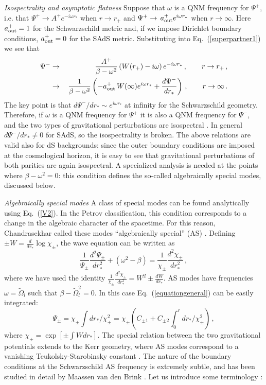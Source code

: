 \documentclass[]{iopart}
\def\be{\begin{equation}}
\def\ee{\end{equation}}
\def\beq{\begin{eqnarray}}
\def\eeq{\end{eqnarray}}
\begin{document}
\noindent
{\it Isospectrality and asymptotic flatness} 
Suppose that $\omega$ is a QNM frequency for $\Psi^+$, i.e. that $\Psi^+
\rightarrow A^{+}e^{-i\omega r_*}$ when $r \rightarrow r_+$ and $\Psi^+
\rightarrow\,a^{+}_{\rm out}e^{i\omega r_*} $ when $r\rightarrow \infty$.
Here $a^{+}_{\rm out}=1$ for the Schwarzschild metric and, if we impose
Dirichlet boundary conditions, $a^{+}_{\rm out}=0$ for the SAdS metric.
Substituting into Eq.~(\ref{superpartner1}) we see that
%
\beq
\Psi^-&\rightarrow& \frac{A^{+}}{\beta-\omega^2}\left (W(r_+)-i\omega \right )e^{-i\omega r_*}\,,\qquad r \rightarrow r_+\,,\\
&\rightarrow & \,\frac{1}{\beta-\omega^2}\left (-a^{+}_{\rm out}\,W(\infty)e^{i\omega r_*}+\frac{d \Psi^{-}}{dr_*}\right ) \,,\qquad r\rightarrow \infty\,.
\eeq
%
The key point is that $d \Psi^{-}/dr_* \sim e^{i\omega r_*} $ at infinity for
the Schwarzschild geometry. Therefore, if $\omega$ is a QNM frequency for
$\Psi^{+}$ it is also a QNM frequency for $\Psi^{-}$, and the two types of
gravitational perturbations are isospectral
\cite{Chandrasekhar:1975qn,chandrarelation}. In general $d\Psi^{-}/dr_* \neq
0$ for SAdS, so the isospectrality is broken.  The above relations are valid
also for dS backgrounds: since the outer boundary conditions are imposed at
the cosmological horizon, it is easy to see that gravitational perturbations
of both parities are again isospectral.  A specialized analysis is needed at
the points where $\beta-\omega^2=0$: this condition defines the so-called
algebraically special modes, discussed below.

\noindent
{\it Algebraically special modes}
A class of special modes can be found analytically using Eq.~(\ref{V2}). In
the Petrov classification, this condition corresponds to a change in the
algebraic character of the spacetime. For this reason, Chandrasekhar called
these modes ``algebraically special'' (AS) \cite{chandraspecial,MTB}.
Defining $\pm W=\frac{d}{dr_*}\log \chi_\pm$, the wave equation can be written
as
%
\begin{equation}
\frac{1}{\Psi_{\pm}}\frac{d^2\Psi_{\pm}}{dr_*^2}+\left
(\omega^2-\beta \right )=
\frac{1}{\chi_\pm}\frac{d^2\chi_\pm}{dr_*^2}\,,
\label{equationgeneral}
\end{equation}
%
where we have used the identity $
\frac{1}{\chi_\pm}\frac{d^2\chi_\pm}{dr_*^2}=W^2\pm\frac{dW}{dr_*}$. AS modes
have frequencies $\omega=\tilde \Omega_l$ such that $\beta-\tilde \Omega_l^2=
0$. In this case Eq.~(\ref{equationgeneral}) can be easily integrated:
%
\be
\Psi_{\pm}=\chi_\pm \int dr_*/\chi_{\pm}^2=\chi_\pm\left
(C_{\pm 1}+C_{\pm 2}\int_{0}^r dr_*/\chi_{\pm}^2\right )\,, \label{solalge}
\ee
%
where $\chi_\pm=\exp\left[\pm\int W dr_*\right]$.  The special relation
between the two gravitational potentials extends to the Kerr geometry, where
AS modes correspond to a vanishing Teukolsky-Starobinsky constant \cite{MTB}.
The nature of the boundary conditions at the Schwarzschild AS frequency is
extremely subtle, and has been studied in detail by Maassen van den Brink
\cite{MaassenvandenBrink:2000ru}. Let us introduce some terminology
\cite{MaassenvandenBrink:2000ru}:
\end{document}
